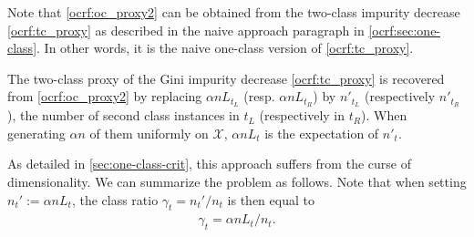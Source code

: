 %
Note that \cref{ocrf:oc_proxy2} can be obtained from the two-class impurity
decrease \cref{ocrf:tc_proxy} as described in the naive approach paragraph in
\cref{ocrf:sec:one-class}. In other words, it is the naive one-class version of
\cref{ocrf:tc_proxy}.
\begin{remark}
    The two-class proxy of the Gini impurity decrease \cref{ocrf:tc_proxy} is
    recovered from \cref{ocrf:oc_proxy2} by replacing $\alpha n L_{t_L}$ (resp.
    $\alpha n L_{t_R}$) by $n'_{t_L}$ (respectively $n'_{t_R}$), the number of
    second class instances in $t_L$ (respectively in $t_R$). When generating
    $\alpha n$ of them uniformly on $\mathcal{X}$, $\alpha n L_{t}$ is the
    expectation of $n'_{t}$.
\end{remark}
%
%
As detailed in \cref{sec:one-class-crit}, this approach suffers from the curse
of dimensionality.  We can summarize the problem as follows.
%
Note that when setting $n_t':=\alpha n L_t$, the class ratio
$\gamma_t=n_t'/n_t$ is then equal to
\begin{align}
    \label{ocrf:def:gamma_t}
    \gamma_t = \alpha n L_t / n_t.
\end{align}
